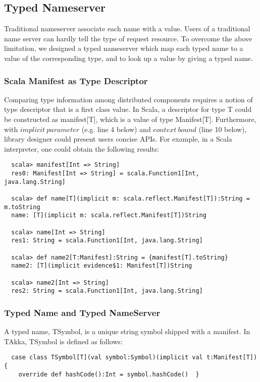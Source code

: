 \subsection{Typed Nameserver}
Traditional nameserver associate each name with a value.  Users of a traditional name server can hardly tell the type of request resource.  To overcome the above limitation, we designed a typed nameserver which map each typed name to a value of the corresponding type, and to look up a value by giving a typed name.

\subsubsection{Scala Manifest as Type Descriptor}
Comparing type information among distributed components requires a notion of type descriptor that is a first class value.  In Scala, a descriptor for type T could be constructed as manifest[T], which is a value of type Manifest[T].  Furthermore, with $implicit\ parameter$ (e.g. line 4 below) and $context\ bound$ (line 10 below), library designer could present users concise APIs.  For example, in a Scala interpreter, one could obtain the following results:

\begin{lstlisting}
  scala> manifest[Int => String]
  res0: Manifest[Int => String] = scala.Function1[Int, java.lang.String]

  scala> def name[T](implicit m: scala.reflect.Manifest[T]):String = m.toString
  name: [T](implicit m: scala.reflect.Manifest[T])String

  scala> name[Int => String]
  res1: String = scala.Function1[Int, java.lang.String]

  scala> def name2[T:Manifest]:String = {manifest[T].toString}
  name2: [T](implicit evidence$1: Manifest[T])String

  scala> name2[Int => String]
  res2: String = scala.Function1[Int, java.lang.String]
\end{lstlisting}

\subsubsection{Typed Name and Typed NameServer}
A typed name, TSymbol, is a unique string symbol shipped with a manifest.  In TAkka, TSymbol is defined as follows:

\begin{lstlisting}
  case class TSymbol[T](val symbol:Symbol)(implicit val t:Manifest[T]) {
    override def hashCode():Int = symbol.hashCode()  }
\end{lstlisting}

